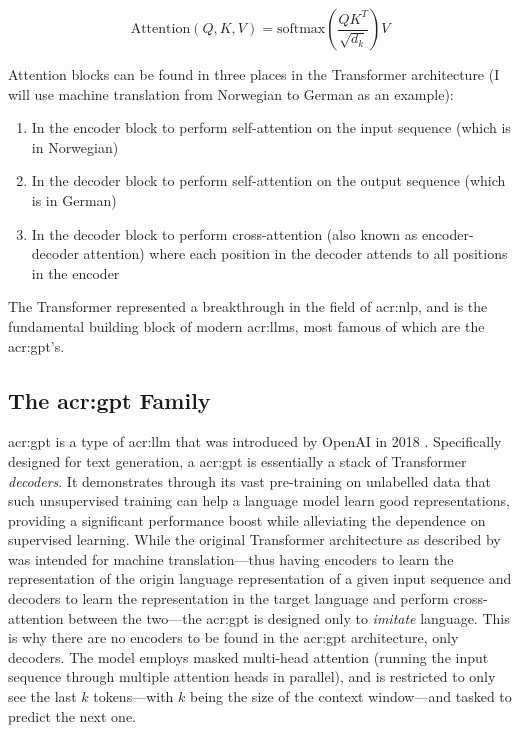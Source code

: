 \begin{equation}
    \text{Attention}(Q, K, V) = \text{softmax}\left(\frac{QK^T}{\sqrt{d_k}}\right)V
    \label{eq:attention}
\end{equation}

Attention blocks can be found in three places in the Transformer architecture \citep[5]{vaswaniAttentionAllYou2017} (I will use machine translation from Norwegian to German as an example):

\begin{enumerate}
    \item In the encoder block to perform self-attention on the input sequence (which is in Norwegian)
    \item In the decoder block to perform self-attention on the output sequence (which is in German)
    \item In the decoder block to perform cross-attention (also known as encoder-decoder attention) where each position in the decoder attends to all positions in the encoder
\end{enumerate}

The Transformer represented a breakthrough in the field of \gls{acr:nlp}, and is the fundamental building block of modern \glspl{acr:llm}, most famous of which are the \acrshort{acr:gpt}'s.

\subsection[The GPT Family]{The \acrshort{acr:gpt} Family}\label{subsec:gpt}

\gls{acr:gpt} is a type of \gls{acr:llm} that was introduced by OpenAI in 2018 \citep{radfordImprovingLanguageUnderstanding2018}. Specifically designed for text generation, a \acrshort{acr:gpt} is essentially a stack of Transformer \textit{decoders}. It demonstrates through its vast pre-training on unlabelled data that such unsupervised training can help a language model learn good representations, providing a significant performance boost while alleviating the dependence on supervised learning. While the original Transformer architecture as described by \cite{vaswaniAttentionAllYou2017} was intended for machine translation---thus having encoders to learn the representation of the origin language representation of a given input sequence and decoders to learn the representation in the target language and perform cross-attention between the two---the \acrshort{acr:gpt} is designed only to \textit{imitate} language. This is why there are no encoders to be found in the \acrshort{acr:gpt} architecture, only decoders. The model employs masked multi-head attention (running the input sequence through multiple attention heads in parallel), and is restricted to only see the last $k$ tokens---with $k$ being the size of the context window---and tasked to predict the next one.

